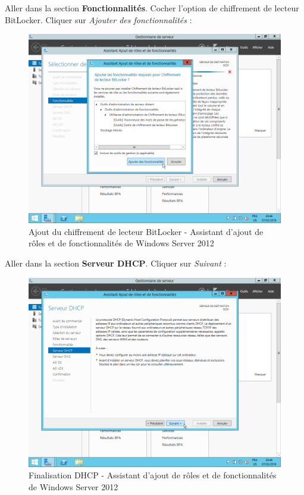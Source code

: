 \newpage
Aller dans la section \textbf{Fonctionnalités}. Cocher l'option de chiffrement de lecteur BitLocker. Cliquer sur \textit{Ajouter des fonctionnalités} :
\begin{figure}[h!]
    \begin{center}
        \includegraphics[scale=0.6]{WS2012_Screenshots/26.png}
        \caption{Ajout du chiffrement de lecteur BitLocker - Assistant d'ajout de rôles et de fonctionnalités de Windows Server 2012}
        \label{WS2012_Screenshots/26}
    \end{center}
\end{figure}
\FloatBarrier

\newpage
Aller dans la section \textbf{Serveur DHCP}. Cliquer sur \textit{Suivant} :
\begin{figure}[h!]
    \begin{center}
        \includegraphics[scale=0.6]{WS2012_Screenshots/27.png}
        \caption{Finalisation DHCP - Assistant d'ajout de rôles et de fonctionnalités de Windows Server 2012}
        \label{WS2012_Screenshots/27}
    \end{center}
\end{figure}
\FloatBarrier

